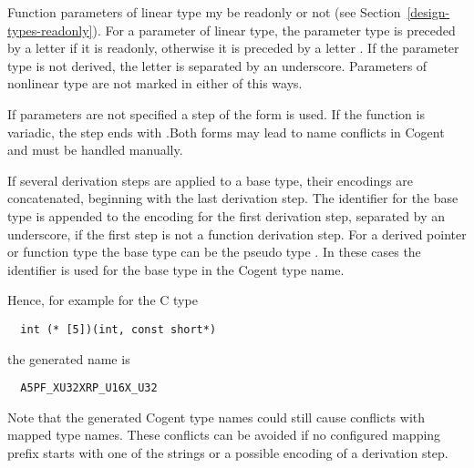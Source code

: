 Function parameters of linear type my be readonly or not (see Section~\ref{design-types-readonly}). For a 
parameter of linear type, the parameter type  is preceded by a letter  if it is readonly,
otherwise it is preceded by a letter . If the parameter type is not derived, the letter is separated
by an underscore. Parameters of nonlinear type are not marked in either of this ways.

If parameters are not specified a step of the form  is used.
If the function is variadic, the step ends with .Both forms
may lead to name conflicts in Cogent and must be handled manually.

If several derivation steps are applied to a base type, their encodings are concatenated, beginning with the 
last derivation step. The identifier for the base type is appended to the encoding for the first derivation step,
separated by an underscore, if the first step is not a function derivation step. For a derived pointer or 
function type the base type can be the pseudo type . In these cases the identifier  is
used for the base type in the Cogent type name.

Hence, for example for the C type
\begin{verbatim}
  int (* [5])(int, const short*)
\end{verbatim}
the generated name is
\begin{verbatim}
  A5PF_XU32XRP_U16X_U32
\end{verbatim}

Note that the generated Cogent type names could still cause conflicts with mapped type names. These conflicts can be
avoided if no configured mapping prefix starts with one of the  strings
or a possible encoding of a derivation step.
